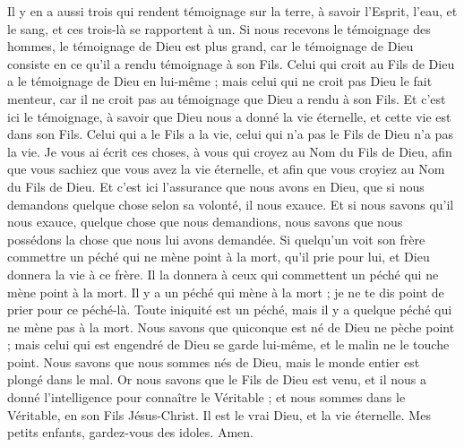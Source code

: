 \begin{multicols}{2}
Il y en a aussi trois qui rendent témoignage sur la terre, à savoir l'Esprit, l'eau, et le sang, et ces trois-là se rapportent à un.
Si nous recevons le témoignage des hommes, le témoignage de Dieu est plus grand, car le témoignage de Dieu consiste en ce qu’il a rendu témoignage à son Fils.
Celui qui croit au Fils de Dieu a le témoignage de Dieu en lui-même ; mais celui qui ne croit pas Dieu le fait menteur, car il ne croit pas au témoignage que Dieu a rendu à son Fils.
Et c'est ici le témoignage, à savoir que Dieu nous a donné la vie éternelle, et cette vie est dans son Fils.
Celui qui a le Fils a la vie, celui qui n'a pas le Fils de Dieu n'a pas la vie.
Je vous ai écrit ces choses, à vous qui croyez au Nom du Fils de Dieu, afin que vous sachiez que vous avez la vie éternelle, et afin que vous croyiez au Nom du Fils de Dieu.
Et c'est ici l’assurance que nous avons en Dieu, que si nous demandons quelque chose selon sa volonté, il nous exauce.
Et si nous savons qu'il nous exauce, quelque chose que nous demandions, nous savons que nous possédons la chose que nous lui avons demandée.
Si quelqu'un voit son frère commettre un péché qui ne mène point à la mort{}, qu’il prie pour lui, et Dieu donnera la vie à ce frère. Il la donnera à ceux qui commettent un péché qui ne mène point à la mort. Il y a un péché qui mène à la mort ; je ne te dis point de prier pour ce péché-là.
Toute iniquité est un péché, mais il y a quelque péché qui ne mène pas à la mort.
Nous savons que quiconque est né de Dieu ne pèche point ; mais celui qui est engendré de Dieu se garde lui-même, et le malin ne le touche point.
Nous savons que nous sommes nés de Dieu, mais le monde entier est plongé dans le mal.
\TextTitle{[Conclusion]}
Or nous savons que le Fils de Dieu est venu, et il nous a donné l'intelligence pour connaître le Véritable ; et nous sommes dans le Véritable, en son Fils Jésus-Christ. Il est le vrai{} Dieu, et la vie éternelle.
Mes petits enfants, gardez-vous des idoles. Amen.
\PPE{}
\end{multicols}
